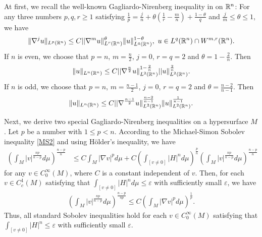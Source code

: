 \documentclass{amsart}
\theoremstyle{definition}
\numberwithin{equation}{section}
\begin{document}
At first, we recall the well-known Gagliardo-Nirenberg inequality in \cite {N} on $\Bbb R^n$:
For any three numbers $p, q, r \geq 1$ satisfying $\frac 1 p =\frac j n+\theta (\frac 1 r -\frac m n) +\frac {1-\theta}q$ and $\frac jm \leq
\theta
\leq 1$, we have
\[\|\nabla^j u\|_{L^p(\Bbb R^n)}\leq C||\nabla^m u\|^{\theta}_{L^r(\Bbb R^n)}\| u\|^{1-\theta}_{L^q(\Bbb R^n)},\,\, u\in L^q(\Bbb R^n)\cap W^{m,r}(\Bbb R^n).\]
If $n$ is even, we choose that $p=n$, $m=\frac n2$, $j=0$, $r=q=2$ and   $\theta= 1-\frac 2 n$. Then
\[\|u\|_{L^n(\Bbb R^n)}\leq C||\nabla^{\frac n 2} u\|^{1-\frac 2 n}_{L^2(\Bbb R^n)}|| u\|^{\frac 2 n}_{L^2(\Bbb R^n)}.\]
If $n$ is odd, we choose that $p=n$, $m=\frac {n-1}2$, $j=0$, $r=q=2$ and   $\theta=\frac {n-2}{n-1}$. Then
\[\|u\|_{L^n(\Bbb R^n)}\leq C||\nabla^{\frac {n-1} 2} u\|^{\frac {n-2}{n-1} }_{L^2(\Bbb R^n)} \| u\|^{\frac 1{n-1} }_{L^2(\Bbb R^n)}.\]

Next, we   derive two special Gagliardo-Nirenberg  inequalities on a hypersurface $M$. Let $p$ be a number with $1\leq p<n$.
According to  the Michael-Simon Sobolev inequality \eqref{MS2} and using H\"older's inequality,   we have
\begin{align}\label{MS4}\left( \int_{M} |v|^{\frac {np}{n-p}} d\mu \right)^{\frac{n-p}{n}}
&\leq C \int_{M} \left| \nabla v\right|^p d\mu +C
\left (\int_{[v\neq 0]}   \left| H \right|^n
  d\mu\right )^{\frac p n}   \left( \int_{M} \left| v\right|^{\frac {np}{n-p}} d\mu \right)^{\frac {n-p}n}
\end{align}
for any $v\in
C^{\infty}_{0}\left( M \right)$, where $C$ is  a constant
independent
of $v$. Then,
for each $v\in
C^{1}_{c}\left( M \right)$  satisfying that $\int_{[v\neq 0]}|H|^n d\mu\leq \varepsilon$ with sufficiently small $\varepsilon$, we have
\begin{align}\label{MS5}\left( \int_{M} |v|^{\frac {np}{n-p}} d\mu \right)^{\frac{n-p}{np}}
\leq C \left( \int_{M} \left| \nabla v\right|^p d\mu \right)^{\frac 1p }.
\end{align}
Thus, all  standard Sobolev    inequalities  hold  for each $v\in
C_0^{\infty}(M)$  satisfying that $\int_{[v\neq 0]}|H|^n\leq \varepsilon$ with sufficiently small $\varepsilon$.
\end{document}

